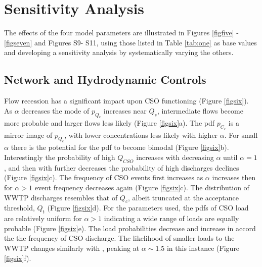 \documentclass{agujournal2018}
\begin{document}
 \section{Sensitivity Analysis}
The ef\/fects of the four model parameters are illustrated in Figures \ref{figfive} - \ref{figseven} and Figures S9- S11, using those listed in Table \ref{tab:one} as base values and developing a sensitivity analysis by systematically varying the others.

\subsection{Network and Hydrodynamic Controls}
Flow recession has a signif\/icant impact upon CSO functioning (Figure \ref{figsix}). As $\alpha$ decreases the mode of $p_{Q_c}$ increases near $Q_s$, intermediate f\/lows become more probable and larger f\/lows less likely (Figure \ref{figsix}a). The pdf $p_{C_c}$ is a mirror image of $p_{Q_c}$, with lower concentrations less likely with higher $\alpha$. For small $\alpha$ there is the potential for the pdf to become bimodal (Figure \ref{figsix}b). Interestingly the probability of high $Q_{CSO}$ increases with decreasing $\alpha$ until $\alpha = 1$, and then with further decreases the probability of high discharges declines (Figure \ref{figsix}c). The frequency of CSO events f\/irst increases as $\alpha$ increases then for $\alpha > 1$ event frequency decreases again (Figure \ref{figsix}c). The distribution of WWTP discharges resembles that of $Q_c$, albeit truncated at the acceptance threshold, $Q_t$ (Figure \ref{figsix}d). For the parameters used, the pdfs of CSO load are relatively uniform for $\alpha > 1$ indicating a wide range of loads are equally probable (Figure \ref{figsix}e). The load probabilities decrease and increase in accord the the frequency of CSO discharge. The likelihood of smaller loads to the WWTP changes similarly with , peaking at $\alpha \sim 1.5$ in this instance (Figure \ref{figsix}f). 
\end{document}
